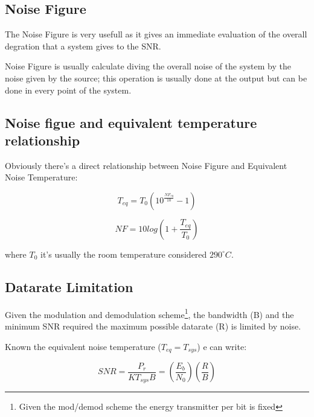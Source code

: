 \subsection{Noise Figure} %
\label{sub:noise_figure}

The Noise Figure is very usefull as it gives an immediate evaluation of the overall degration that a system gives to the SNR.

Noise Figure is usually  calculate diving the overall noise of the system by the noise given by the source; this operation is usually done at the output but can be done in every point of the system.


\subsection{Noise figue and equivalent temperature relationship} %
\label{sub:noise_figue_and_equivalent_temperature_relationship}

Obviously there's a direct relationship between Noise Figure and Equivalent Noise Temperature:

\begin{equation}
	T_{eq}= T_0(10^{\frac{NF_{eq}}{10}}-1)
\end{equation}

\begin{equation}
	NF = 10log\left(1+\frac{T_{eq}}{T_0}\right)
\end{equation}

where $T_0$ it's usually the room temperature considered $290^{\circ}C$.


\subsection{Datarate Limitation} %
\label{sub:datarate_limitation}


Given the modulation and demodulation scheme\footnote{Given the mod/demod scheme the energy transmitter per bit is fixed}, the bandwidth (B) and the minimum SNR required the maximum possible datarate (R) is limited by noise.

Known the equivalent noise temperature ($T_{eq}=T_{sys}$) e can write:

\begin{equation}	
SNR = \frac{P_r}{KT_{sys}B}=\left(\frac{E_b}{N_0}\right)\left(\frac{R}{B}\right)
\end{equation}

